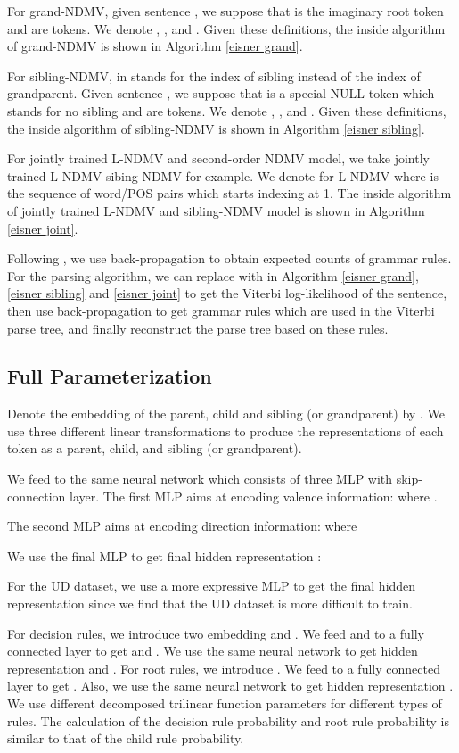 \documentclass[11pt]{article}
\begin{document}
For grand-NDMV, given sentence , we suppose that  is the imaginary root token and  are tokens.
We denote , , and . Given these definitions, the inside algorithm of grand-NDMV is shown in Algorithm \ref{eisner grand}. 

For sibling-NDMV,  in  stands for the index of sibling instead of the index of grandparent. Given sentence , we suppose that  is a special NULL token which stands for no sibling and  are tokens. We denote , , and . Given these definitions, the inside algorithm of sibling-NDMV is shown in Algorithm \ref{eisner sibling}.

For jointly trained L-NDMV and second-order NDMV model, we take jointly trained L-NDMV sibing-NDMV for example. We denote  for L-NDMV where  is the sequence of word/POS pairs which starts indexing at 1.
The inside algorithm of jointly trained L-NDMV and sibling-NDMV model is shown in Algorithm \ref{eisner joint}.
 
Following , we use back-propagation to obtain expected counts of grammar rules.  For the parsing algorithm, we can replace  with  in Algorithm \ref{eisner grand}, \ref{eisner sibling} and \ref{eisner joint} to get the Viterbi log-likelihood of the sentence, then use back-propagation to get grammar rules which are used in the Viterbi parse tree, and finally reconstruct the parse tree based on these rules. 
 

\subsection{Full Parameterization}

Denote the embedding of the parent, child and sibling (or grandparent) by .  We use three different linear transformations to produce the representations of each token as a parent, child, and sibling (or grandparent).


We feed  to the same neural network which consists of three MLP with skip-connection layer. The first MLP aims at encoding valence information:
 where .

The second MLP aims at encoding direction information:
 where   

We use the final MLP to get final hidden representation :


For the UD dataset, we use a more expressive MLP to get the final hidden representation  since we find that the UD dataset is more difficult to train. 
 


For decision rules, we introduce two embedding  and .  We feed  and  to a fully connected layer  to get  and . We use the same neural network to get hidden representation  and .  For root rules, we introduce . We feed  to a fully connected layer  to get . Also, we use the same neural network to get hidden representation .  We use different decomposed trilinear function parameters for different types of rules. The calculation of the decision rule probability and root rule probability is similar to that of the child rule probability.
\end{document}
